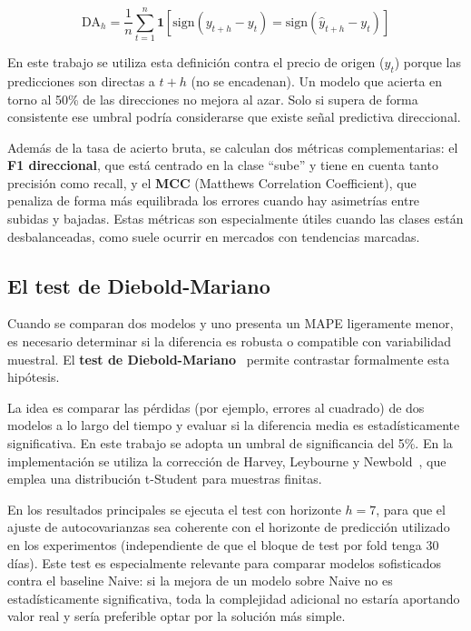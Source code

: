 \[
\text{DA}_h = \frac{1}{n} \sum_{t=1}^{n} \mathbf{1}[\text{sign}(y_{t+h} - y_t) = \text{sign}(\hat{y}_{t+h} - y_t)]
\]

En este trabajo se utiliza esta definición contra el precio de origen ($y_t$) porque las predicciones son directas a $t+h$ (no se encadenan). Un modelo que acierta en torno al 50\% de las direcciones no mejora al azar. Solo si supera de forma consistente ese umbral podría considerarse que existe señal predictiva direccional.

Además de la tasa de acierto bruta, se calculan dos métricas complementarias: el \textbf{F1 direccional}, que está centrado en la clase ``sube'' y tiene en cuenta tanto precisión como recall, y el \textbf{MCC} (Matthews Correlation Coefficient), que penaliza de forma más equilibrada los errores cuando hay asimetrías entre subidas y bajadas. Estas métricas son especialmente útiles cuando las clases están desbalanceadas, como suele ocurrir en mercados con tendencias marcadas.

\subsection{El test de Diebold-Mariano}

Cuando se comparan dos modelos y uno presenta un MAPE ligeramente menor, es necesario determinar si la diferencia es robusta o compatible con variabilidad muestral. El \textbf{test de Diebold-Mariano}~\cite{diebold1995comparing} permite contrastar formalmente esta hipótesis.

La idea es comparar las pérdidas (por ejemplo, errores al cuadrado) de dos modelos a lo largo del tiempo y evaluar si la diferencia media es estadísticamente significativa. En este trabajo se adopta un umbral de significancia del 5\%. En la implementación se utiliza la corrección de Harvey, Leybourne y Newbold~\cite{harvey1997testing}, que emplea una distribución t-Student para muestras finitas.

En los resultados principales se ejecuta el test con horizonte $h=7$, para que el ajuste de autocovarianzas sea coherente con el horizonte de predicción utilizado en los experimentos (independiente de que el bloque de test por fold tenga 30 días). Este test es especialmente relevante para comparar modelos sofisticados contra el baseline Naive: si la mejora de un modelo sobre Naive no es estadísticamente significativa, toda la complejidad adicional no estaría aportando valor real y sería preferible optar por la solución más simple.
